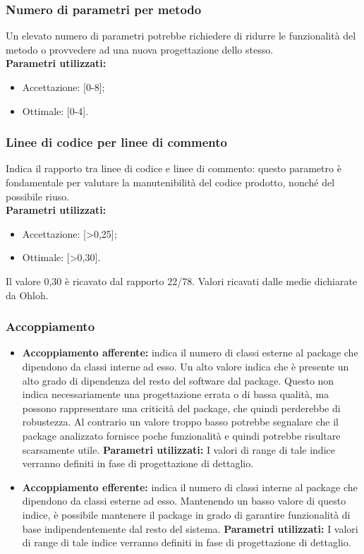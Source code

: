 \subsubsection{Numero di parametri per metodo}
Un elevato numero di parametri potrebbe richiedere di ridurre le funzionalità del metodo o provvedere ad una nuova progettazione dello stesso.\\
\textbf{Parametri utilizzati:}
\begin{itemize}
\item Accettazione: [0-8];
\item Ottimale: [0-4].
\end{itemize}
\subsubsection{Linee di codice per linee di commento}
Indica il rapporto tra linee di codice e linee di commento: questo parametro è fondamentale per valutare la manutenibilità del codice prodotto, nonché del possibile riuso.\\
\textbf{Parametri utilizzati:}
\begin{itemize}
\item Accettazione: [>0,25];
\item Ottimale: [>0,30].
\end{itemize}
Il valore 0,30 è ricavato dal rapporto 22/78. Valori ricavati dalle medie dichiarate da Ohloh.
\subsubsection{Accoppiamento}
\begin{itemize}
\item \textbf{Accoppiamento afferente:} indica il numero di classi esterne al package che dipendono da classi interne ad esso. Un alto valore indica che è presente un alto grado di dipendenza del resto del software dal package. Questo non indica necessariamente una progettazione errata o di bassa qualità, ma possono rappresentare una criticità del package, che quindi perderebbe di robustezza. Al contrario un valore troppo basso potrebbe segnalare che il package analizzato fornisce poche funzionalità e quindi potrebbe risultare scarsamente utile.
\textbf{Parametri utilizzati:}
I valori di range di tale indice verranno definiti in fase di progettazione di dettaglio.
\item \textbf{Accoppiamento efferente:} indica il numero di classi interne al package che dipendono da classi esterne ad esso. Mantenendo un basso valore di questo indice, è possibile mantenere il package in grado di garantire funzionalità di base indipendentemente dal resto del sistema.
\textbf{Parametri utilizzati:}
I valori di range di tale indice verranno definiti in fase di progettazione di dettaglio.
\end{itemize}
